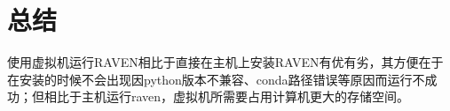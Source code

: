 \section{总结}

使用虚拟机运行RAVEN相比于直接在主机上安装RAVEN有优有劣，其方便在于在安装的时候不会出现因python版本不兼容、conda路径错误等原因而运行不成功；但相比于主机运行raven，虚拟机所需要占用计算机更大的存储空间。